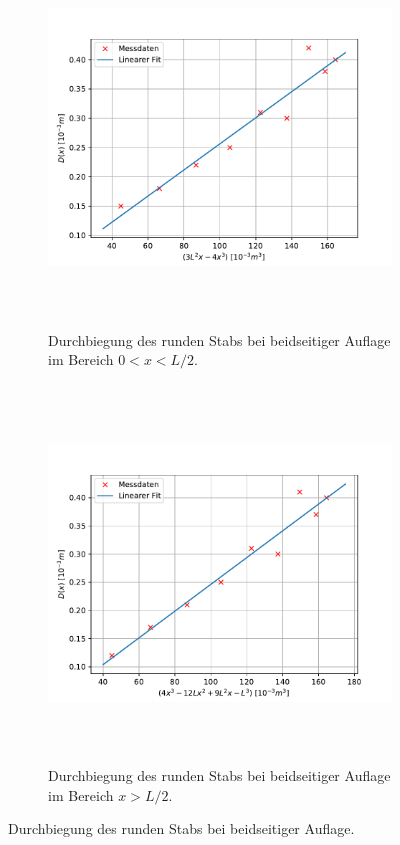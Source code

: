 \begin{figure}[H]
  \begin{subfigure}{\textwidth}
  \centering
  \includegraphics[height=10cm]{content/plots/rundb1.pdf}
  \caption{Durchbiegung des runden Stabs bei beidseitiger Auflage im Bereich $0<x<L/2$.}
  \label{fig:LinRegrundb1}
  \end{subfigure}
  \hfill
  \begin{subfigure}{\textwidth}
  \centering
  \includegraphics[height=10cm]{content/plots/rundb2.pdf}
  \caption{Durchbiegung des runden Stabs bei beidseitiger Auflage im Bereich $x>L/2$.}
  \label{fig:LinRegrundb2}
  \end{subfigure}
  \caption{Durchbiegung des runden Stabs bei beidseitiger Auflage.}
  \label{fig:LinRegrundb}
\end{figure}
